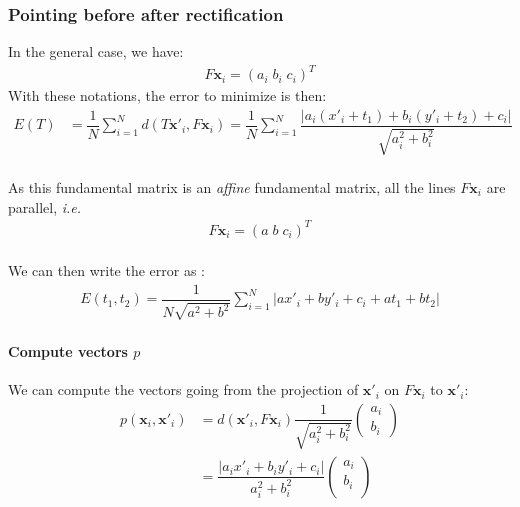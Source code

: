 \documentclass[paper=a4, fontsize=11pt, onecolumn, tikz, dvipsnames, svgnames, x11names]{article}
\begin{document}
\subsubsection{Pointing before after rectification}
In the general case, we have:
\begin{align*}
F\textbf{x}_i = \left( a_i \; b_i \; c_i \right)^T
\end{align*}
With these notations, the error to minimize is then:
\begin{align*}
E(T) &= \dfrac{1}{N} \sum\limits_{i=1}^{N} d(T\textbf{x}'_i, F\textbf{x}_i) = \dfrac{1}{N} \sum\limits_{i=1}^{N} \dfrac{|a_i(x'_i + t_1) + b_i(y'_i +t_2)+ c_i|}{\sqrt{a_i^2 + b_i^2}}
\end{align*}\\
As this fundamental matrix is an \textit{affine} fundamental matrix, all the lines $F\textbf{x}_i$ are parallel, \textit{i.e.}
\begin{align*}
F\textbf{x}_i = \left( a\; b\; c_i \right)^T
\end{align*}\\
We can then write the error as :
\begin{align*}
E(t_1, t_2) = \dfrac{1}{N\sqrt{a^2 + b^2}} \sum\limits_{i=1}^{N} |ax'_i+ by'_i + c_i + at_1 + bt_2|
\end{align*}
\paragraph{Compute vectors $p$\\}
We can compute the vectors going from the projection of $\textbf{x}'_i$ on $F\textbf{x}_i$ to $\textbf{x}'_i$:
\begin{align*}
p(\textbf{x}_i, \textbf{x}'_i) &= d(\textbf{x}'_i, F\textbf{x}_i)\dfrac{1}{\sqrt{a_i^2 + b_i^2}}
\begin{pmatrix}
a_i \\
b_i
\end{pmatrix}  \\
&=
\dfrac{|a_ix'_i + b_iy'_i + c_i|}{a_i^2 + b_i^2}
\begin{pmatrix}
a_i \\
b_i \\
\end{pmatrix}
\end{align*}
\end{document}
